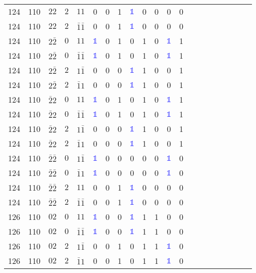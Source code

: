 \begin{longtable*}{c| cccccccccccccccccccc }
124& 110& $22$& $2$& $11$& 0& 0& 1& \textcolor{blue}{$\mathds{1}$}& 0& 0& 0& 0\\
124& 110& $22$& $2$& $\bar{1}\bar{1}$& 0& 0& 1& \textcolor{blue}{$\mathds{1}$}& 0& 0& 0& 0\\
124& 110& $2\bar{2}$& $0$& $11$& \textcolor{blue}{$\mathds{1}$}& 0& 1& 0& 1& 0& \textcolor{blue}{$\mathds{1}$}& 1\\
124& 110& $2\bar{2}$& $0$& $\bar{1}\bar{1}$& \textcolor{blue}{$\mathds{1}$}& 0& 1& 0& 1& 0& \textcolor{blue}{$\mathds{1}$}& 1\\
124& 110& $2\bar{2}$& $2$& $1\bar{1}$& 0& 0& 0& \textcolor{blue}{$\mathds{1}$}& 1& 0& 0& 1\\
124& 110& $2\bar{2}$& $2$& $\bar{1}1$& 0& 0& 0& \textcolor{blue}{$\mathds{1}$}& 1& 0& 0& 1\\
124& 110& $\bar{2}2$& $0$& $11$& \textcolor{blue}{$\mathds{1}$}& 0& 1& 0& 1& 0& \textcolor{blue}{$\mathds{1}$}& 1\\
124& 110& $\bar{2}2$& $0$& $\bar{1}\bar{1}$& \textcolor{blue}{$\mathds{1}$}& 0& 1& 0& 1& 0& \textcolor{blue}{$\mathds{1}$}& 1\\
124& 110& $\bar{2}2$& $2$& $1\bar{1}$& 0& 0& 0& \textcolor{blue}{$\mathds{1}$}& 1& 0& 0& 1\\
124& 110& $\bar{2}2$& $2$& $\bar{1}1$& 0& 0& 0& \textcolor{blue}{$\mathds{1}$}& 1& 0& 0& 1\\
124& 110& $\bar{2}\bar{2}$& $0$& $1\bar{1}$& \textcolor{blue}{$\mathds{1}$}& 0& 0& 0& 0& 0& \textcolor{blue}{$\mathds{1}$}& 0\\
124& 110& $\bar{2}\bar{2}$& $0$& $\bar{1}1$& \textcolor{blue}{$\mathds{1}$}& 0& 0& 0& 0& 0& \textcolor{blue}{$\mathds{1}$}& 0\\
124& 110& $\bar{2}\bar{2}$& $2$& $11$& 0& 0& 1& \textcolor{blue}{$\mathds{1}$}& 0& 0& 0& 0\\
124& 110& $\bar{2}\bar{2}$& $2$& $\bar{1}\bar{1}$& 0& 0& 1& \textcolor{blue}{$\mathds{1}$}& 0& 0& 0& 0\\
126& 110& $02$& $0$& $11$& \textcolor{blue}{$\mathds{1}$}& 0& 0& \textcolor{blue}{$\mathds{1}$}& 1& 1& 0& 0\\
126& 110& $02$& $0$& $\bar{1}\bar{1}$& \textcolor{blue}{$\mathds{1}$}& 0& 0& \textcolor{blue}{$\mathds{1}$}& 1& 1& 0& 0\\
126& 110& $02$& $2$& $1\bar{1}$& 0& 0& 1& 0& 1& 1& \textcolor{blue}{$\mathds{1}$}& 0\\
126& 110& $02$& $2$& $\bar{1}1$& 0& 0& 1& 0& 1& 1& \textcolor{blue}{$\mathds{1}$}& 0\\

\end{longtable*}
